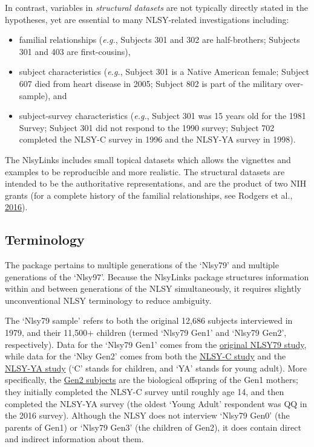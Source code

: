\documentclass[smallextended]{svjour3}       %
\providecommand{\tightlist}{%
  \setlength{\itemsep}{0pt}\setlength{\parskip}{0pt}}
\begin{document}
In contrast, variables in \emph{structural datasets} are not typically
directly stated in the hypotheses, yet are essential to many
NLSY-related investigations including:

\begin{itemize}
\tightlist
\item
  familial relationships (\emph{e.g.}, Subjects 301 and 302 are
  half-brothers; Subjects 301 and 403 are first-cousins),
\item
  subject characteristics (\emph{e.g.}, Subject 301 is a Native American
  female; Subject 607 died from heart disease in 2005; Subject 802 is
  part of the military over-sample), and
\item
  subject-survey characteristics (\emph{e.g.}, Subject 301 was 15 years
  old for the 1981 Survey; Subject 301 did not respond to the 1990
  survey; Subject 702 completed the NLSY-C survey in 1996 and the
  NLSY-YA survey in 1998).
\end{itemize}

The NlsyLinks includes small topical datasets which allows the vignettes
and examples to be reproducible and more realistic. The structural
datasets are intended to be the authoritative representations, and are
the product of two NIH grants (for a complete history of the familial
relationships, see Rodgers et al.,
\href{http://link.springer.com/article/10.1007\%2Fs10519-016-9785-3}{2016}).

\hypertarget{terminology}{%
\subsection{Terminology}\label{terminology}}

The package pertains to multiple generations of the `Nlsy79' and
multiple generations of the `Nlsy97'. Because the NlsyLinks package
structures information within and between generations of the NLSY
simultaneously, it requires slightly unconventional NLSY terminology to
reduce ambiguity.

The `Nlsy79 sample' refers to both the original 12,686 subjects
interviewed in 1979, and their 11,500+ children (termed `Nlsy79 Gen1'
and `Nlsy79 Gen2', respectively). Data for the `Nlsy79 Gen1' comes from
the \href{https://www.nlsinfo.org/content/cohorts/nlsy79}{original NLSY79 study},
while data for the `Nlsy Gen2' comes from both the \href{}{NLSY-C study}
and the \href{}{NLSY-YA study} (`C' stands for children, and `YA' stands
for young adult). More specifically, the
\href{https://www.nlsinfo.org/content/cohorts/nlsy79-children}{Gen2 subjects} are the
biological offspring of the Gen1 mothers; they initially completed the
NLSY-C survey until roughly age 14, and then completed the NLSY-YA
survey (the oldest `Young Adult' respondent was QQ in the 2016 survey).
Although the NLSY does not interview `Nlsy79 Gen0' (the parents of Gen1)
or `Nlsy79 Gen3' (the children of Gen2), it does contain direct and
indirect information about them.
\end{document}
